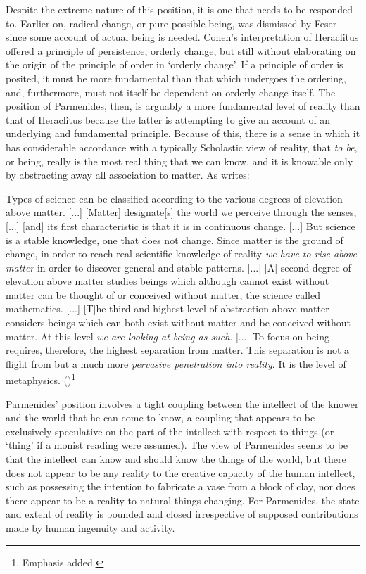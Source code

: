 Despite the extreme nature of this position, it is one that needs to be responded to. Earlier on, radical change, or pure possible being, was dismissed by Feser since some account of actual being is needed. Cohen's interpretation of Heraclitus offered a principle of persistence, orderly change, but still without elaborating on the origin of the principle of order in `orderly change'.
If a principle of order is posited, it must be more fundamental than that which undergoes the ordering, and, furthermore, must not itself be dependent on orderly change itself. The position of Parmenides, then, is arguably a more fundamental level of reality than that of Heraclitus because the latter is attempting to give an account of an underlying and fundamental principle. Because of this, there is a sense in which it has considerable accordance with a typically Scholastic view of reality, that \emph{to be}, or being, really is the most real thing that we can know, and it is knowable only by abstracting away all association to matter. As \citeauthor[][]{de1981christian} writes:
\begin{quoting}
Types of science can be classified according to the various degrees of elevation above matter. [...] [Matter] designate[s] the world we perceive through the senses, [...] [and] its first characteristic is that it is in continuous change. [...] But science is a stable knowledge, one that does not change. Since matter is the ground of change, in order to reach real scientific knowledge of reality \emph{we have to rise above matter} in order to discover general and stable patterns. [...] [A] second degree of elevation above matter studies beings which although cannot exist without matter can be thought of or conceived without matter, the science called mathematics. [...] [T]he third and highest level of abstraction above matter considers beings which can both exist without matter and be conceived without matter. At this level \emph{we are looking at being as such}. [...] To focus on being requires, therefore, the highest separation from matter. This separation is not a flight from but a much more \emph{pervasive penetration into reality}. It is the level of metaphysics.
(\citeyear[][44--45]{de1981christian})\footnote{Emphasis added.}
\end{quoting}

Parmenides' position involves a tight coupling between the intellect of the knower and the world that he can come to know, a coupling that appears to be exclusively speculative on the part of the intellect with respect to things (or `thing' if a monist reading were assumed). The view of Parmenides seems to be that the intellect can know and should know the things of the world, but there does not appear to be any reality to the creative capacity of the human intellect, such as possessing the intention to fabricate a vase from a block of clay, nor does there appear to be a reality to natural things changing. For Parmenides, the state and extent of reality is bounded and closed irrespective of supposed contributions made by human ingenuity and activity.


